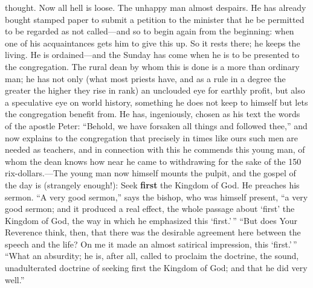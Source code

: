 \documentclass[12pt,a4paper,openany]{book}
\newcommand{\opage}[1]{\marginnote{\footnotesize\textit{[#1]}}}
\begin{document}
thought. Now all hell is loose. The unhappy man almost despairs. He has
already bought stamped paper to submit a petition to the minister that
he be permitted to be regarded as not called---and so to begin again from
the beginning: when one of his acquaintances gets him to give this up. So
it rests there; he keeps the living. He is ordained---and the Sunday has
come when he is to be presented to the congregation. The rural dean by
whom this is done is a more than ordinary man; he has not only (what most
priests have, and as a rule in a degree the greater the higher they rise
in rank) an unclouded eye for earthly profit, but also a speculative eye
on world history, something he does not keep to himself but lets the
congregation benefit from. He has, ingeniously, chosen as his text the
words of the apostle Peter: ``Behold, we have forsaken all things and
followed thee,'' and now explains to the congregation that precisely in
times like ours such men are needed as teachers, and in connection with
this he commends this young man, of whom the dean knows how near he came
to withdrawing for the sake of the 150 rix-dollars.---The young man now
himself mounts the pulpit, and the gospel of the day is (strangely
enough!): Seek \textbf{first} the Kingdom of God. He preaches his sermon. ``A very
good sermon,'' says the bishop, who was himself present, ``a very good
sermon; and it produced a real effect, the whole passage about `first' the
Kingdom of God, the way in which he emphasized this `first.'\,'' ``But
does Your Reverence think, then, that there was the desirable agreement
here between \opage{67}the speech and the life? On me it made an almost satirical
impression, this `first.'\,'' ``What an absurdity; he is, after all,
called to proclaim the doctrine, the sound, unadulterated doctrine of
seeking first the Kingdom of God; and that he did very well.'' %
\end{document}
